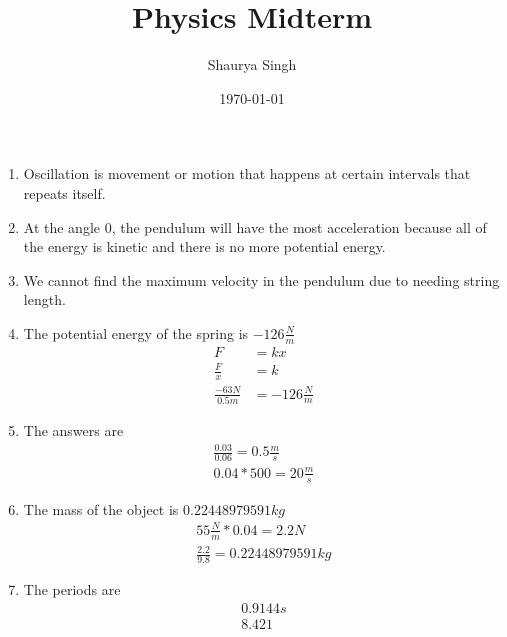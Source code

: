 \documentclass[11pt]{article}
\author{Shaurya Singh}
\date{\today}
\title{Physics Midterm}
\begin{document}
\maketitle
\begin{enumerate}
\item Oscillation is movement or motion that happens at certain intervals that repeats itself.

\item At the angle 0, the pendulum will have the most acceleration because all of the energy is kinetic and there is no more potential energy.

\item We cannot find the maximum velocity in the pendulum due to needing string length.

\item The potential energy of the spring is \(-126\frac{N}{m}\)
\begin{align*}
F&=kx\\
\frac{F}{x}&=k\\
\frac{-63N}{0.5m}&=-126 \frac{N}{m}
\end{align*}

\item The answers are
\begin{align*}
\frac{0.03}{0.06}=0.5\frac{m}{s}\\
0.04*500=20\frac{m}{s}
\end{align*}

\item The mass of the object is \(0.22448979591 kg\)
\begin{align*}
55\frac{N}{m}*0.04=2.2N\\
\frac{2.2}{9.8}=0.22448979591 kg
\end{align*}

\item The periods are
\begin{align*}
0.9144s\\
8.421
\end{align*}
\end{enumerate}
\end{document}

